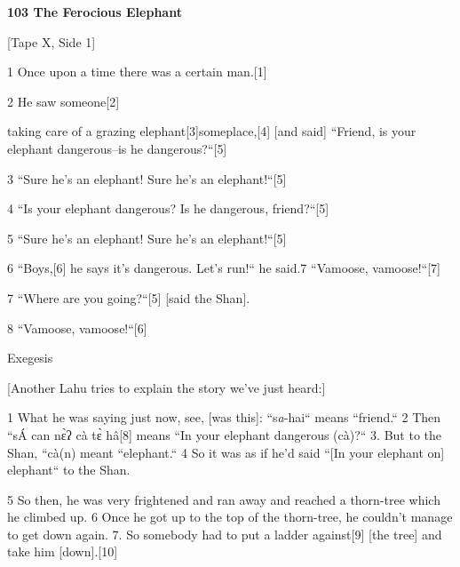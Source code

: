 
\textbf{103 The Ferocious Elephant }

[Tape X, Side 1]

1 Once upon a time there was a certain man.[1]

2 He saw someone[2]

taking care of a grazing elephant[3]someplace,[4] [and said] ``Friend,
is your elephant dangerous--is he dangerous?``[5]

3 ``Sure he's an elephant! Sure he's an elephant!``[5]

4 ``Is your elephant dangerous? Is he dangerous, friend?``[5]

5 ``Sure he's an elephant! Sure he's an elephant!``[5]

6 ``Boys,[6] he says it's dangerous. Let's run!`` he said.7 ``Vamoose,
vamoose!``[7]

7 ``Where are you going?``[5] [said the Shan].

8 ``Vamoose, vamoose!``[6]

\begin{center}
Exegesis
\end{center}

\leftskip=0pt
[Another Lahu tries to explain the story we've just heard:]

1 What he was saying just now, see, [was this]: ``s\textit{a}-hai``
means ``friend.`` 2 Then ``sÁ can nɛ̀ʔ cà tɛ̀ hâ[8]
means ``In your elephant dangerous (cà)?`` 3. But to the Shan,
``cà(n) meant ``elephant.`` 4 So it was as if he'd said
``[In your elephant on] elephant`` to the Shan.

5 So then, he was very frightened and ran away and reached a thorn-tree which he
climbed up. 6 Once he got up to the top of the thorn-tree, he couldn't manage to
get down again. 7. So somebody had to put a ladder against[9] [the tree] and take
him [down].[10]

